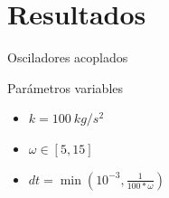 \section{Resultados}\label{sec:resultados}

\begin{frame}{Osciladores acoplados}
    \begin{minipage}{0.45\textwidth}
        \begin{block}{Parámetros variables}
            \begin{itemize}
                \item $k = 100\ kg/s^2$
                \item $\omega \in [5, 15]$
                \item $dt = \min\left(10^{-3}, \frac{1}{100*\omega}\right)$
            \end{itemize}
        \end{block}
    \end{minipage}
    \hfill
    \begin{minipage}{0.45\textwidth}
    \end{minipage}
\end{frame}

